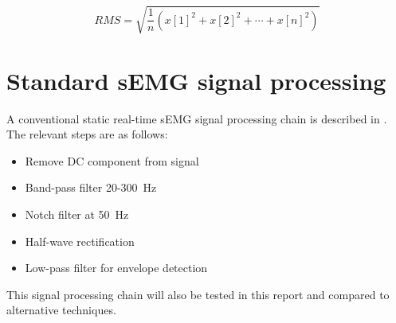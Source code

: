 \begin{equation}
    RMS = \sqrt{\frac{1}{n} (x[1]^2 + x[2]^2 + \cdots + x[n]^2)}
    \label{eq:rms}
\end{equation}

\section{Standard sEMG signal processing}\label{section:standard_semg_processing}
A conventional static real-time sEMG signal processing chain is described in \cite{muscle_force_estimation}. The relevant steps are as follows:
\begin{itemize}
    \item Remove DC component from signal
    \item Band-pass filter 20-\SI{300}{\hertz}
    \item Notch filter at \SI{50}{\hertz}
    \item Half-wave rectification
    \item Low-pass filter for envelope detection
\end{itemize}

This signal processing chain will also be tested in this report and compared to alternative techniques.